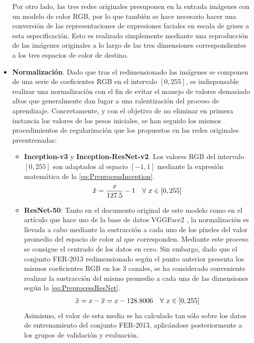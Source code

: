 \begin{itemize}
  Por otro lado, las tres redes originales presuponen en la entrada imágenes con un modelo de color RGB, por lo que también se hace necesario hacer una conversión de las representaciones de expresiones faciales en escala de grises a esta especificación. Esto es realizado simplemente mediante una reproducción de las imágenes originales a lo largo de las tres dimensiones correspondientes a los tres espacios de color de destino.
  \item \textbf{Normalización}. Dado que tras el redimensionado las imágenes se componen de una serie de coeficientes RGB en el intervalo $[0, 255]$, es indispensable realizar una normalización con el fin de evitar el manejo de valores demasiado altos que generalmente dan lugar a una ralentización del proceso de aprendizaje. Concretamente, y con el objetivo de no eliminar en primera instancia los valores de los pesos iniciales, se han seguido los mismos procedimientos de regularización que los propuestos en las redes originales preentrenadas:
        \begin{itemize}
            \item \textbf{Inception-v3} y \textbf{Inception-ResNet-v2}. Los valores RGB del intervalo $[0, 255]$ son adaptados al espacio $[-1, 1]$ mediante la expresión matemática de la \autoref{eq:PreprocessInception}.
                \begin{align} \label{eq:PreprocessInception}
                  \hat{x} &= \frac{x}{127.5} - 1 & \forall \text{\space} x \in [0, 255]
                \end{align}
            \item \textbf{ResNet-50}: Tanto en el documento original de este modelo \cite{ResNet} como en el artículo que hace uso de la base de datos VGGFace2 \cite{VGGFace2}, la normalización es llevada a cabo mediante la sustracción a cada uno de los píxeles del valor promedio del espacio de color al que corresponden. Mediante este proceso se consigue el centrado de los datos en cero. Sin embargo, dado que el conjunto FER-2013 redimensionado según el punto anterior presenta los mismos coeficientes RGB en los 3 canales, se ha considerado conveniente realizar la sustracción del mismo promedio a cada una de las dimensiones según la \autoref{eq:PreprocessResNet}.
                \begin{align} \label{eq:PreprocessResNet}
                  \hat{x} &= x - \overline{x} = x - 128.8006 & \forall \text{\space} x \in [0, 255]
                \end{align}
            Asimismo, el valor de esta media se ha calculado tan sólo sobre los datos de entrenamiento del conjunto FER-2013, aplicándose posteriormente a los grupos de validación y evaluación. 
        \end{itemize}
        

\end{itemize}
